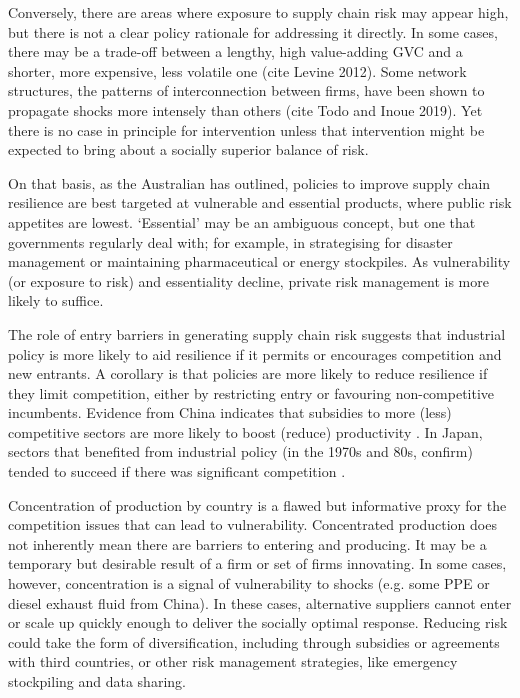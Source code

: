 \documentclass{article}
\begin{document}
Conversely, there are areas where exposure to supply chain risk may appear high, but there is not a clear policy rationale for addressing it directly. In some cases, there may be a trade-off between a lengthy, high value-adding GVC and a shorter, more expensive, less volatile one (cite Levine 2012). Some network structures, the patterns of interconnection between firms, have been shown to propagate shocks more intensely than others (cite Todo and Inoue 2019). Yet there is no case in principle for intervention unless that intervention might be expected to bring about a socially superior balance of risk.

On that basis, as the Australian \textcite{productivity_commission_vulnerable_2021} has outlined, policies to improve supply chain resilience are best targeted at vulnerable and essential products, where public risk appetites are lowest. `Essential' may be an ambiguous concept, but one that governments regularly deal with; for example, in strategising for disaster management or maintaining pharmaceutical or energy stockpiles. As vulnerability (or exposure to risk) and essentiality decline, private risk management is more likely to suffice. 

The role of entry barriers in generating supply chain risk suggests that industrial policy is more likely to aid resilience if it permits or encourages competition and new entrants. A corollary is that policies are more likely to reduce resilience if they limit competition, either by restricting entry or favouring non-competitive incumbents. Evidence from China indicates that subsidies to more (less) competitive sectors are more likely to boost (reduce) productivity \parencite{aghion_industrial_2015}. In Japan, sectors that benefited from industrial policy (in the 1970s and 80s, confirm) tended to succeed if there was significant competition \parencite{porter_competition_2004}.

Concentration of production by country is a flawed but informative proxy for the competition issues that can lead to vulnerability. Concentrated production does not inherently mean there are barriers to entering and producing. It may be a temporary but desirable result of a firm or set of firms innovating. In some cases, however, concentration is a signal of vulnerability to shocks (e.g. some PPE or diesel exhaust fluid from China). In these cases, alternative suppliers cannot enter or scale up quickly enough to deliver the socially optimal response. Reducing risk could take the form of diversification, including through subsidies or agreements with third countries, or other risk management strategies, like emergency stockpiling and data sharing.
\end{document}

